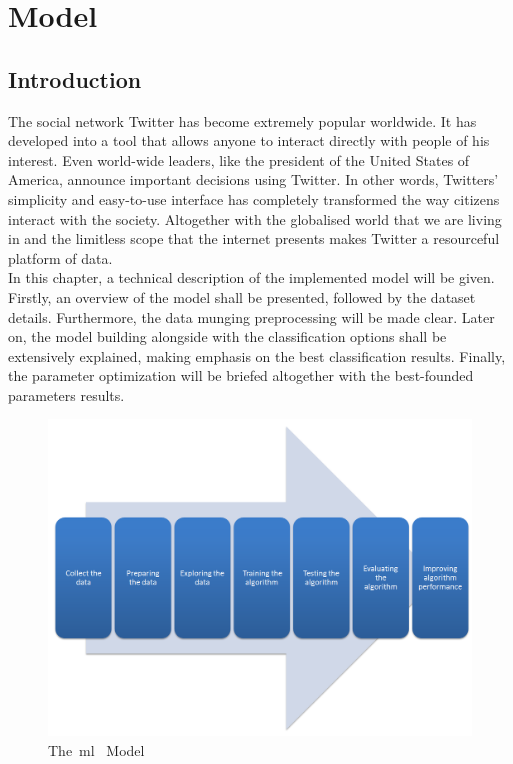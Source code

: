 \chapter{Model}
\label{chap:model}

\section{Introduction}
\label{sec:intromodel}
The social network Twitter has become extremely popular worldwide. It has developed into a tool that allows anyone to interact directly with people of his interest. Even world-wide leaders, like the president of the United States of America, announce important decisions using Twitter. In other words, Twitters' simplicity and easy-to-use interface has completely transformed the way citizens interact with the society. Altogether with the globalised world that we are living in and the limitless scope that the internet presents makes Twitter a resourceful platform of data.\\
In this chapter, a technical description of the implemented model will be given.\\
Firstly, an overview of the model shall be presented, followed by the dataset details. Furthermore, the data munging preprocessing will be made clear. Later on, the model building alongside with the classification options shall be extensively explained, making emphasis on the best classification results. Finally, the parameter optimization will be briefed altogether with the best-founded parameters results.
\begin{figure}
	\centering
	\includegraphics[]{img/model.png}
	\caption{The~\acl{ml}~\cite{model} Model}
	\label{fig:model}
\end{figure}
\par
